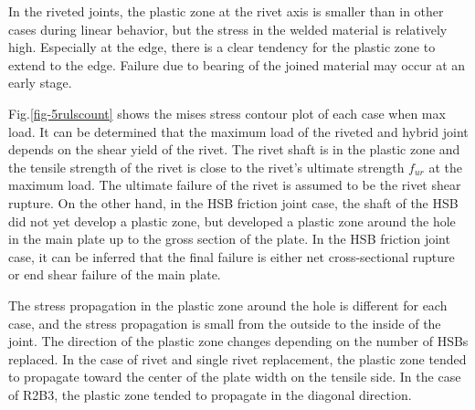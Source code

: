 In the riveted joints, the plastic zone at the rivet axis is smaller than in other cases during linear behavior, but the stress in the welded material is relatively high. Especially at the edge, there is a clear tendency for the plastic zone to extend to the edge. Failure due to bearing of the joined material may occur at an early stage.


Fig.\ref{fig-5rulscount} shows the mises stress contour plot of each case when max load. It can be determined that the maximum load of the riveted and hybrid joint depends on the shear yield of the rivet. The rivet shaft is in the plastic zone and the tensile strength of the rivet is close to the rivet's ultimate strength $f_{ur}$ at the maximum load. The ultimate failure of the rivet is assumed to be the rivet shear rupture. On the other hand, in the \ac{HSB} friction joint case, the shaft of the \ac{HSB} did not yet develop a plastic zone, but developed a plastic zone around the hole in the main plate up to the gross section of the plate. In the \ac{HSB} friction joint case, it can be inferred that the final failure is either net cross-sectional rupture or end shear failure of the main plate. 

The stress propagation in the plastic zone around the hole is different for each case, and the stress propagation is small from the outside to the inside of the joint. The direction of the plastic zone changes depending on the number of \ac{HSB}s replaced. In the case of rivet and single rivet replacement, the plastic zone tended to propagate toward the center of the plate width on the tensile side. In the case of R2B3, the plastic zone tended to propagate in the diagonal direction.

